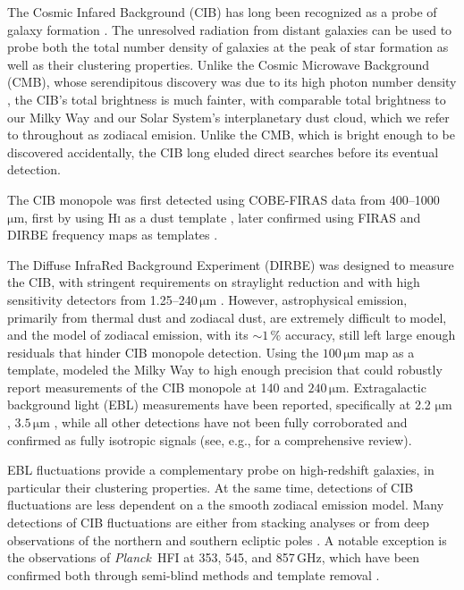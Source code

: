 \documentclass{aa}
\def\Planck{\textit{Planck}}
\begin{document}

The Cosmic Infared Background (CIB) has long been recognized as a probe of galaxy formation \citep{partridge1967}. The unresolved radiation from distant galaxies can be used to probe both the total number density of galaxies at the peak of star formation as well as their clustering properties. Unlike the Cosmic Microwave Background (CMB), whose serendipitous discovery was due to its high photon number density \citep{penzias:1965}, the CIB's total brightness is much fainter, with comparable total brightness to our Milky Way and our Solar System's interplanetary dust cloud, which we refer to throughout as zodiacal emision. Unlike the CMB, which is bright enough to be discovered accidentally, the CIB long eluded direct searches before its eventual detection.

The CIB monopole was first detected using COBE-FIRAS data from 400--1000\,$\mathrm{\mu m}$, first by using \textsc{Hi} as a dust template \citep{puget1996}, later confirmed using FIRAS and DIRBE frequency maps as templates \citep{fixsen1998}.

The Diffuse InfraRed Background Experiment (DIRBE) was designed to measure the CIB, with stringent requirements on straylight reduction and with high sensitivity detectors from 1.25--240\,$\mathrm{\mu m}$ \citep{boggess92,hauser1998}. However, astrophysical emission, primarily from thermal dust and zodiacal dust, are extremely difficult to model, and the \citet{kelsall1998} model of zodiacal emission, with its  $\sim1\,\%$ accuracy, still left large enough residuals that hinder CIB monopole detection. Using the $100\,\mathrm{\mu m}$ map as a template, \citet{arendt1998} modeled the Milky Way to high enough precision that \citet{hauser1998} could robustly report measurements of the CIB monopole at 140 and $240\,\mathrm{\mu m}$. Extragalactic background light (EBL) measurements have been reported, specifically at 2.2 $\mathrm{\mu m}$ \citep{wright:2000,gorjian:2000,wright:2001}, $3.5\,\mathrm{\mu m}$ \citep{dwek:1998b,gorjian:2000,wright:2000}, while all other detections have not been fully corroborated and confirmed as fully isotropic signals (see, e.g., \citealt{hauser:2001} for a comprehensive review).

EBL fluctuations provide a complementary probe on high-redshift galaxies, in particular their clustering properties. At the same time, detections of CIB fluctuations are less dependent on a the smooth zodiacal emission model. Many detections of CIB fluctuations are either from stacking analyses \cite{dole:2006} or from deep observations of the northern and southern ecliptic poles \citet{matsumoto:2011}. A notable exception is the observations of \Planck\ HFI at 353, 545, and 857\,GHz, which have been confirmed both through semi-blind methods \citep{planck2016-XLVIII,mccarthy:2024} and template removal \citep{lenz2019}.
\end{document}
